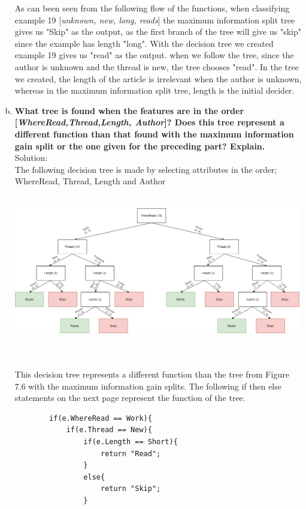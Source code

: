 \documentclass{article}
\begin{document}
\begin{enumerate}[(a)]
        As can been seen from the following flow of the functions, when classifying example 19 [\emph{unknown, new, long, reads}] the maximum information split tree gives us "Skip" as the output, as the first branch of the tree will give us "skip" since the example has length "long". With the decision tree we created example 19 gives us "read" as the output. when we follow the tree, since the author is unknown and the thread is new, the tree chooses "read". In the tree we created, the length of the article is irrelevant when the author is unknown, whereas in the maximum information split tree, length is the initial decider.
        \newpage
    \item \textbf{What tree is found when the features are in the order [\emph{WhereRead,Thread,Length, Author}]? Does this tree represent a different function than that found with the maximum information gain split or the one given for the preceding part? Explain.} \\Solution:\\
    The following decision tree is made by selecting attributes in the order; WhereRead, Thread, Length and Author
    \begin{center}
    \hspace*{-3cm} \includegraphics[width=475px,height=250px]{tree2.png}
    \end{center}\\
    This decision tree represents a different function than the tree from Figure 7.6 with the maximum information gain splits. The following if then else statements on the next page represent the function of the tree.
    \newpage
    \begin{lstlisting}
        if(e.WhereRead == Work){
            if(e.Thread == New){
                if(e.Length == Short){
                    return "Read";
                }
                else{
                    return "Skip";
                }

\end{lstlisting}
\end{enumerate}
\end{document}

